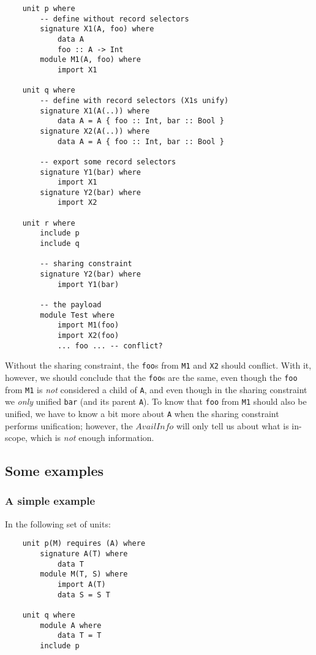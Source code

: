 \documentclass{article}
\newcommand{\I}[1]{\ensuremath{\mathit{#1}}}
\begin{document}
\begin{verbatim}
    unit p where
        -- define without record selectors
        signature X1(A, foo) where
            data A
            foo :: A -> Int
        module M1(A, foo) where
            import X1

    unit q where
        -- define with record selectors (X1s unify)
        signature X1(A(..)) where
            data A = A { foo :: Int, bar :: Bool }
        signature X2(A(..)) where
            data A = A { foo :: Int, bar :: Bool }

        -- export some record selectors
        signature Y1(bar) where
            import X1
        signature Y2(bar) where
            import X2

    unit r where
        include p
        include q

        -- sharing constraint
        signature Y2(bar) where
            import Y1(bar)

        -- the payload
        module Test where
            import M1(foo)
            import X2(foo)
            ... foo ... -- conflict?
\end{verbatim}

Without the sharing constraint, the \verb|foo|s from \verb|M1| and \verb|X2|
should conflict.  With it, however, we should conclude that the \verb|foo|s
are the same, even though the \verb|foo| from \verb|M1| is \emph{not}
considered a child of \verb|A|, and even though in the sharing constraint
we \emph{only} unified \verb|bar| (and its parent \verb|A|).  To know that
\verb|foo| from \verb|M1| should also be unified, we have to know a bit
more about \verb|A| when the sharing constraint performs unification;
however, the \I{AvailInfo} will only tell us about what is in-scope, which
is \emph{not} enough information.

\subsection{Some examples}

\subsubsection{A simple example}

In the following set of units:

\begin{verbatim}
    unit p(M) requires (A) where
        signature A(T) where
            data T
        module M(T, S) where
            import A(T)
            data S = S T

    unit q where
        module A where
            data T = T
        include p
\end{verbatim}
\end{document}
